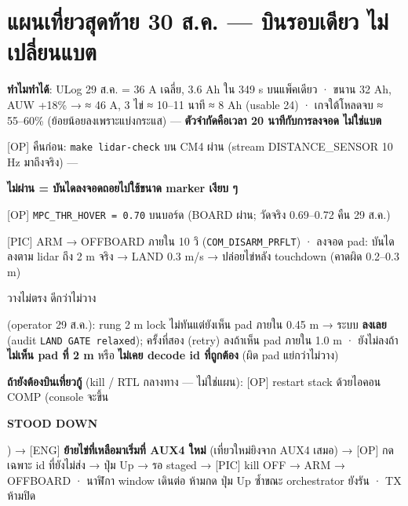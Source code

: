 \documentclass[11pt,a4paper]{article}
\newcommand{\code}[1]{\texttt{\small #1}}
\newcommand{\hl}[1]{\colorbox{hlyel}{\strut #1}}
\newcommand{\hlr}[1]{\colorbox{hlred}{\strut\color{stopred}\bfseries #1}}
\newcommand{\who}[1]{{\small\color{blu}[#1]}}
\begin{document}
\section{แผนเที่ยวสุดท้าย 30 ส.ค. — บินรอบเดียว ไม่เปลี่ยนแบต}
\begin{cl}
\item \textbf{ทำไมทำได้}: ULog 29 ส.ค. = 36 A เฉลี่ย, 3.6 Ah ใน 349 s บนแพ็คเดียว · ขนาน 32 Ah, AUW +18\% → ≈ 46 A, 3 ไข่ ≈ 10–11 นาที ≈ 8 Ah (usable 24) · เกจใต้โหลดจบ ≈ 55–60\% (ย้อยน้อยลงเพราะแบ่งกระแส) — \textbf{ตัวจำกัดคือเวลา 20 นาทีกับการลงจอด ไม่ใช่แบต}
\item \who{OP} คืนก่อน: \code{make lidar-check} บน CM4 ผ่าน (stream DISTANCE_SENSOR 10 Hz มาถึงจริง) — \hlr{ไม่ผ่าน = บันไดลงจอดถอยไปใช้ขนาด marker เงียบ ๆ}
\item \who{OP} \code{MPC_THR_HOVER = 0.70} บนบอร์ด (BOARD ผ่าน; วัดจริง 0.69–0.72 คืน 29 ส.ค.)
\item \who{PIC} ARM → OFFBOARD ภายใน 10 วิ (\code{COM_DISARM_PRFLT}) · ลงจอด pad: บันไดลงตาม lidar ถึง 2 m จริง → LAND 0.3 m/s → ปล่อยไข่หลัง touchdown (คาดผิด 0.2–0.3 m)
\item \hl{วางไม่ตรง ดีกว่าไม่วาง} (operator 29 ส.ค.): rung 2 m lock ไม่ทันแต่ยังเห็น pad ภายใน 0.45 m → ระบบ \textbf{ลงเลย} (audit \code{LAND GATE relaxed}); ครั้งที่สอง (retry) ลงถ้าเห็น pad ภายใน 1.0 m · ยังไม่ลงถ้า \textbf{ไม่เห็น pad ที่ 2 m} หรือ \textbf{ไม่เคย decode id ที่ถูกต้อง} (ผิด pad แย่กว่าไม่วาง)
\item \textbf{ถ้ายังต้องบินเที่ยวกู้} (kill / RTL กลางทาง — ไม่ใช่แผน): \who{OP} restart stack ด้วยไอคอน COMP (console จะขึ้น \hlr{STOOD DOWN}) → \who{ENG} \textbf{ย้ายไข่ที่เหลือมาเริ่มที่ AUX4 ใหม่} (เที่ยวใหม่ยิงจาก AUX4 เสมอ) → \who{OP} กดเฉพาะ id ที่ยังไม่ส่ง → ปุ่ม Up → รอ staged → \who{PIC} kill OFF → ARM → OFFBOARD · นาฬิกา window เดินต่อ ห้ามกด ปุ่ม Up ซ้ำขณะ orchestrator ยังรัน · TX ห้ามปิด
\end{cl}

\end{document}
